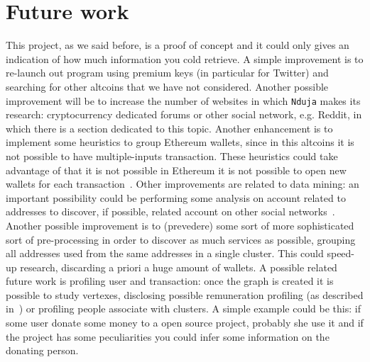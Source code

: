 \section{Future work}
This project, as we said before, is a proof of concept and it could only gives
an indication of how much information you cold retrieve. A simple improvement
is to re-launch out program using premium keys (in particular for Twitter) and
searching for other altcoins that we have not considered. Another possible
improvement will be to increase the number of websites in which \texttt{Nduja}
makes its research: cryptocurrency dedicated forums or other social network,
e.g. Reddit, in which there is a section dedicated to this topic. Another
enhancement is to implement some heuristics to group Ethereum wallets, since in
this altcoins it is not possible to have multiple-inputs transaction. These
heuristics could take advantage of that it is not possible in Ethereum it is
not possible to open new wallets for each transaction~\cite{ethersok}. Other
improvements are related to data mining: an important possibility could be
performing some analysis on account related to addresses to discover, if
possible, related account on other social networks~\cite{osinference}. Another
possible improvement is to (prevedere) some sort of more sophisticated sort of
pre-processing in order to discover as much services as possible, grouping all
addresses used from the same addresses in a single cluster. This could speed-up
research, discarding a priori a huge amount of wallets. A possible related
future work is profiling user and transaction: once the graph is created it is
possible to study vertexes, disclosing possible remuneration profiling (as
described in~\cite{fullDiscl}) or profiling people associate with clusters. A
simple example could be this: if some user donate some money to a open source
project, probably she use it and if the project has some peculiarities you
could infer some information on the donating person.
